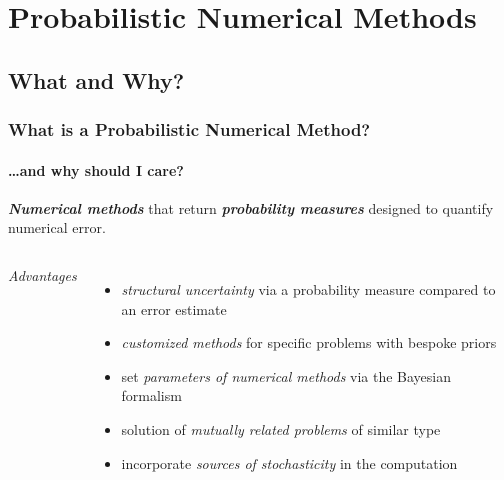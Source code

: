\documentclass[10pt,usepdftitle=false,aspectratio=169]{beamer}
\begin{document}
\section{Probabilistic Numerical Methods}

\subsection{What and Why?}

\begin{frame}\frametitle{What is a Probabilistic Numerical Method?}
	\framesubtitle{\dots and why should I care?}

	\begin{block}{}
		\emph{\bf Numerical methods} that return \emph{\bf probability measures} designed to
		quantify numerical error.
	\end{block}

	\vspace{1em}

	\begin{columns}


		\emph{Advantages}
		\begin{itemize}
			\item \textit{structural uncertainty} via a probability measure compared to an error estimate
			\item \textit{customized methods} for specific problems with bespoke priors
			\item set \textit{parameters of numerical methods} via the Bayesian formalism
			\item solution of \textit{mutually related problems} of similar type
			\item incorporate \textit{sources of stochasticity} in the computation
		\end{itemize}


		\centering

\end{columns}
\end{frame}
\end{document}
